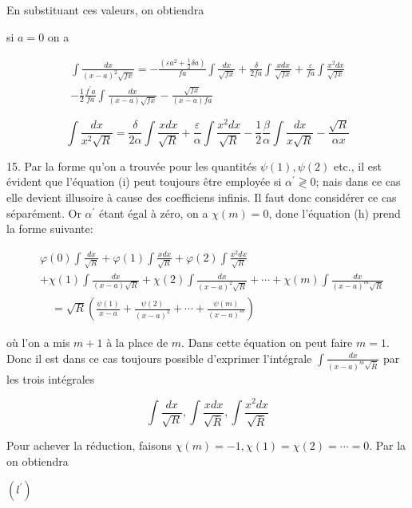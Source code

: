 \documentclass{article}
\begin{document}
En substituant ces valeurs, on obtiendra

si \(a=0\) on a

\[
\begin{gathered}
\int \frac{d x}{(x-a)^{2} \sqrt{f x}}=-\frac{\left(\varepsilon a^{2}+\frac{1}{2} \delta a\right)}{f a} \int \frac{d x}{\sqrt{f x}}+\frac{\delta}{2 f a} \int \frac{x d x}{\sqrt{f x}}+\frac{\varepsilon}{f a} \int \frac{x^{2} d x}{\sqrt{f x}} \\
-\frac{1}{2} \frac{f^{\prime} a}{f a} \int \frac{d x}{(x-a) \sqrt{f x}}-\frac{\sqrt{f x}}{(x-a) f a}
\end{gathered}
\]

\[
\int \frac{d x}{x^{2} \sqrt{R}}=\frac{\delta}{2 \alpha} \int \frac{x d x}{\sqrt{R}}+\frac{\varepsilon}{\alpha} \int \frac{x^{2} d x}{\sqrt{R}}-\frac{1}{2} \frac{\beta}{\alpha} \int \frac{d x}{x \sqrt{R}}-\frac{\sqrt{R}}{\alpha x}
\]

15. Par la forme qu'on a trouvée pour les quantités \(\psi(1), \psi(2)\) etc., il est évident que l'équation (i) peut toujours être employée si \(\alpha^{\prime} \gtrless 0\); nais dans ce cas elle devient illusoire à cause des coefficiens infinis. Il faut donc considérer ce cas séparément. Or \(\alpha^{\prime}\) étant égal à zéro, on a \(\chi(m)=0\), done l'équation (h) prend la forme suivante:

\[
\begin{aligned}
& \varphi(0) \int \frac{d x}{\sqrt{R}}+\varphi(1) \int \frac{x d x}{\sqrt{R}}+\varphi(2) \int \frac{x^{2} d x}{\sqrt{R}} \\
& +\chi(1) \int \frac{d x}{(x-a) \sqrt{R}}+\chi(2) \int \frac{d x}{(x-a)^{2} \sqrt{R}}+\cdots+\chi(m) \int \frac{d x}{(x-a)^{m} \sqrt{R}} \\
& \quad=\sqrt{R}\left(\frac{\psi(1)}{x-a}+\frac{\psi(2)}{(x-a)^{2}}+\cdots+\frac{\psi(m)}{(x-a)^{m}}\right)
\end{aligned}
\]

où l'on a mis \(m+1\) à la place de \(m\). Dans cette équation on peut faire \(m=1\). Donc il est dans ce cas toujours possible d'exprimer l'intégrale \(\int \frac{d x}{(x-a)^{m} \sqrt{\bar{R}}}\) par les trois intégrales

\[
\int \frac{d x}{\sqrt{R}}, \int \frac{x d x}{\sqrt{\bar{R}}}, \int \frac{x^{2} d x}{\sqrt{\bar{R}}}
\]

Pour achever la réduction, faisons \(\chi(m)=-1, \chi(1)=\chi(2)=\cdots=0\). Par la on obtiendra

\(\left(l^{\prime}\right)\)
\end{document}
